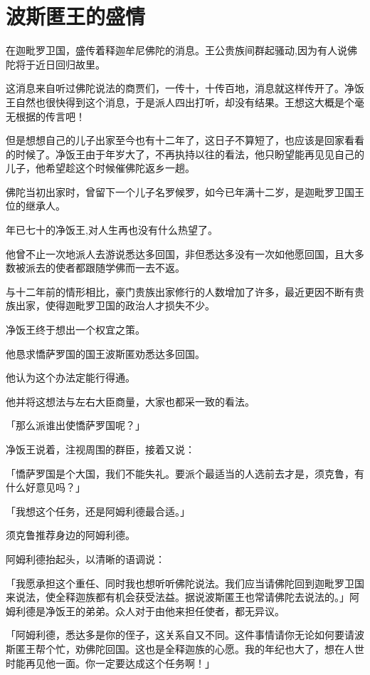 \documentclass[twoside,openany]{book}
\begin{document}
\section{波斯匿王的盛情}\label{sec7.3}

在迦毗罗卫国，盛传着释迦牟尼佛陀的消息。王公贵族间群起骚动,因为有人说佛陀将于近日回归故里。

这消息来自听过佛陀说法的商贾们，一传十，十传百地，消息就这样传开了。净饭王自然也很快得到这个消息，于是派人四出打听，却没有结果。王想这大概是个毫无根据的传言吧！

但是想想自己的儿子出家至今也有十二年了，这日子不算短了，也应该是回家看看的时候了。净饭王由于年岁大了，不再执持以往的看法，他只盼望能再见见自己的儿子，他希望趁这个时候催佛陀返乡一趟。

佛陀当初出家时，曾留下一个儿子名罗候罗，如今已年满十二岁，是迦毗罗卫国王位的继承人。

年已七十的净饭王,对人生再也没有什么热望了。

他曾不止一次地派人去游说悉达多回国，非但悉达多没有一次如他愿回国，且大多数被派去的使者都跟随学佛而一去不返。

与十二年前的情形相比，豪门贵族出家修行的人数增加了许多，最近更因不断有贵族出家，使得迦毗罗卫国的政治人才损失不少。

净饭王终于想出一个权宜之策。

他恳求憍萨罗国的国王波斯匿劝悉达多回国。

他认为这个办法定能行得通。

他并将这想法与左右大臣商量，大家也都采一致的看法。

「那么派谁出使憍萨罗国呢？」

净饭王说着，注视周围的群臣，接着又说：

「憍萨罗国是个大国，我们不能失礼。要派个最适当的人选前去才是，须克鲁，有什么好意见吗？」

「我想这个任务，还是阿姆利德最合适。」

须克鲁推荐身边的阿姆利德。

阿姆利德抬起头，以清晰的语调说：

「我愿承担这个重任、同时我也想听听佛陀说法。我们应当请佛陀回到迦毗罗卫国来说法，使全释迦族都有机会获受法益。据说波斯匿王也常请佛陀去说法的。」阿姆利德是净饭王的弟弟。众人对于由他来担任使者，都无异议。

「阿姆利德，悉达多是你的侄子，这关系自又不同。这件事情请你无论如何要请波斯匿王帮个忙，劝佛陀回国。这也是全释迦族的心愿。我的年纪也大了，想在人世时能再见他一面。你一定要达成这个任务啊！」
\end{document}
